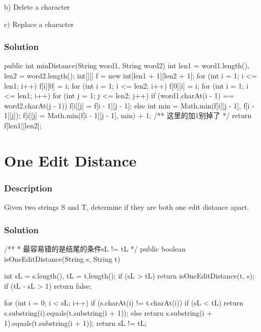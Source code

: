 b) Delete a character

c) Replace a character

\subsubsection{Solution}

\begin{Code}
public int minDistance(String word1, String word2) {
    int len1 = word1.length(), len2 = word2.length();
    int[][] f = new int[len1 + 1][len2 + 1];
    for (int i = 1; i <= len1; i++) {
        f[i][0] = i;
    }
    for (int i = 1; i <= len2; i++) {
        f[0][i] = i;
    }
    for (int i = 1; i <= len1; i++) {
        for (int j = 1; j <= len2; j++) {
            if (word1.charAt(i - 1) == word2.charAt(j - 1)) {
                f[i][j] = f[i - 1][j - 1];
            } else {
                int min = Math.min(f[i][j - 1], f[i - 1][j]);
                f[i][j] = Math.min(f[i - 1][j - 1], min) + 1; /** 这里的加1别掉了 */
            }
        }
    }
    return f[len1][len2];
}
\end{Code}

\newpage

\section{One Edit Distance} %

\subsubsection{Description}
Given two strings S and T, determine if they are both one edit distance apart.

\subsubsection{Solution}

\begin{Code}
/**
 * 最容易错的是结尾的条件sL != tL
 */
public boolean isOneEditDistance(String s, String t) {
    int sL = s.length(), tL = t.length();
    if (sL > tL) {
        return isOneEditDistance(t, s);
    }
    if (tL - sL > 1) {
        return false;
    }

    for (int i = 0; i < sL; i++) {
        if (s.charAt(i) != t.charAt(i)) {
            if (sL < tL) {
                return s.substring(i).equals(t.substring(i + 1));
            } else {
                return s.substring(i + 1).equals(t.substring(i + 1));
            }
        }
    }
    return sL != tL;
}
\end{Code}

